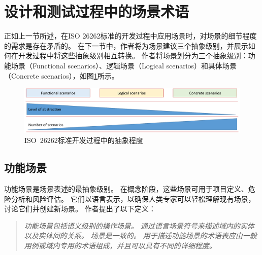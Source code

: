 \section{设计和测试过程中的场景术语}
\label{terminologie}
%
正如上一节所述，在ISO 26262标准的开发过程中应用场景时，对场景的细节程度的需求是存在矛盾的。
在下一节中，作者将为场景建议三个抽象级别，并展示如何在开发过程中将这些抽象级别相互转换。
作者将场景划分为三个抽象级别：功能场景（Functional scenarios）、逻辑场景（Logical scenarios）和具体场景（Concrete scenarios），如图\ref{fig:Abstraktionsebenen}所示。

\begin{figure}
	\centering
	\includegraphics[width=1.0\textwidth]{./4_terminology/graphics/Abstraktionsebenen_reduziert2}
	\caption{ISO~26262标准开发过程中的抽象程度}
	\label{fig:Abstraktionsebenen}
\end{figure}

\subsection{功能场景}
功能场景是场景表述的最抽象级别。
在概念阶段，这些场景可用于项目定义、危险分析和风险评估。
它们以语言表示，以确保人类专家可以轻松理解现有场景，讨论它们并创建新场景。
作者提出了以下定义：
\begin{quote}
\textit{
功能场景包括语义级别的操作场景。
通过语言场景符号来描述域内的实体以及实体间的关系。
场景是一致的。
用于描述功能场景的术语表应由一般用例或域内专用的术语组成，并且可以具有不同的详细程度。
}
\end{quote}

